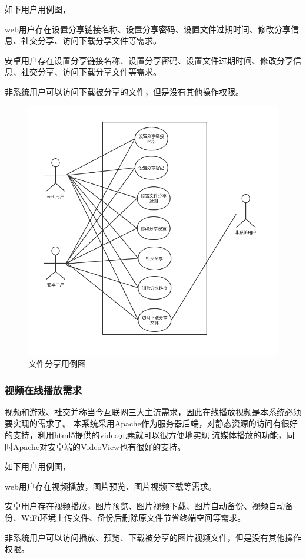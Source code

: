 如下用户用例图，

web用户存在设置分享链接名称、设置分享密码、设置文件过期时间、修改分享信息、社交分享、访问下载分享文件等需求。

安卓用户存在设置分享链接名称、设置分享密码、设置文件过期时间、修改分享信息、社交分享、访问下载分享文件等需求。

非系统用户可以访问下载被分享的文件，但是没有其他操作权限。
\begin{figure}[H]
  \centering
  \includegraphics[width=120mm]{./figures/file_share_yongli.png}
  \caption{文件分享用例图}
\end{figure}

\subsubsection{视频在线播放需求}
视频和游戏、社交并称当今互联网三大主流需求，因此在线播放视频是本系统必须要实现的需求了。
本系统采用Apache作为服务器后端，对静态资源的访问有很好的支持，利用html5提供的video元素就可以很方便地实现
流媒体播放的功能，同时Apache对安卓端的VideoView也有很好的支持。

如下用户用例图，

web用户存在视频播放，图片预览、图片视频下载等需求。

安卓用户存在视频播放，图片预览、图片视频下载、图片自动备份、视频自动备份、WiFi环境上传文件、备份后删除原文件节省终端空间等需求。

非系统用户可以访问播放、预览、下载被分享的图片视频文件，但是没有其他操作权限。

